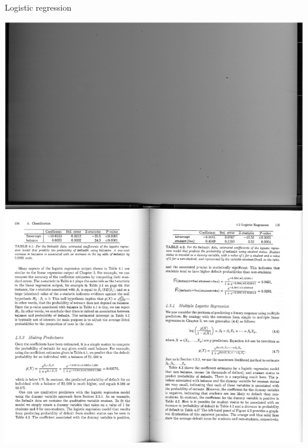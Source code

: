 \documentclass[14pt]{beamer}
\begin{document}
\begin{frame}{Logistic regression}
\centerline{\includegraphics[width=.7\textwidth]{Table2}} 


\end{frame}
\end{document}
